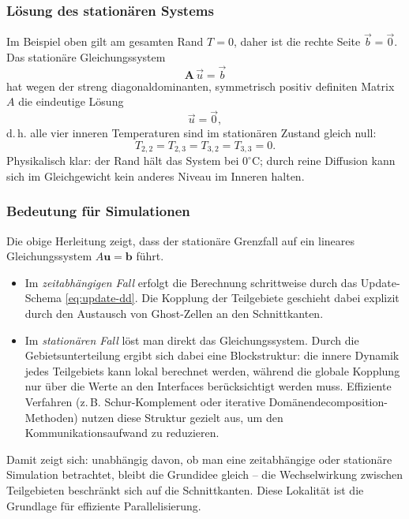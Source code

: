 \subsubsection*{Lösung des stationären Systems}

Im Beispiel oben gilt am gesamten Rand $T=0$, daher ist die rechte Seite $\vec{b}=\vec{0}$.
Das stationäre Gleichungssystem
\[
\mathbf{A}\,\vec{u}=\vec{b}
\]
hat wegen der streng diagonaldominanten, symmetrisch positiv definiten Matrix $A$ die eindeutige Lösung
\[
\vec{u}=\vec{0},
\]
d.\,h. alle vier inneren Temperaturen sind im stationären Zustand gleich null:
\[
T_{2,2}=T_{2,3}=T_{3,2}=T_{3,3}=0.
\]
Physikalisch klar: der Rand hält das System bei $0^\circ$C; durch reine Diffusion kann sich im Gleichgewicht kein anderes Niveau im Inneren halten.


\subsubsection{Bedeutung für Simulationen}

Die obige Herleitung zeigt, dass der stationäre Grenzfall auf ein lineares Gleichungssystem
\(
A \mathbf{u} = \mathbf{b}
\)
führt.  

\begin{itemize}
	\item Im \emph{zeitabhängigen Fall} erfolgt die Berechnung schrittweise durch       das Update-Schema 
	\eqref{eq:update-dd}. Die Kopplung der Teilgebiete geschieht dabei explizit durch den 
	Austausch von Ghost-Zellen an den Schnittkanten.  
	
	\item Im \emph{stationären Fall} löst man direkt das Gleichungssystem. 
	Durch die Gebietsunterteilung ergibt sich dabei eine Blockstruktur: 
	die innere Dynamik jedes Teilgebiets kann lokal berechnet werden, 
	während die globale Kopplung nur über die Werte an den Interfaces berücksichtigt werden muss.  
	Effiziente Verfahren (z.\,B. Schur-Komplement oder iterative Domänendecomposition-Methoden) 
	nutzen diese Struktur gezielt aus, um den Kommunikationsaufwand zu reduzieren.
\end{itemize}


\medskip
\noindent
Damit zeigt sich: unabhängig davon, ob man eine zeitabhängige oder stationäre Simulation betrachtet, 
bleibt die Grundidee gleich – die Wechselwirkung zwischen Teilgebieten beschränkt sich auf die Schnittkanten. 
Diese Lokalität ist die Grundlage für effiziente Parallelisierung.


